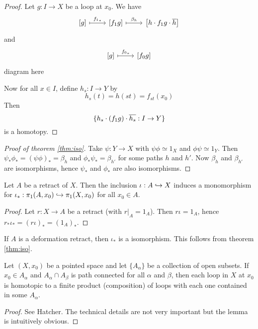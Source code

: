 \begin{proof}
	Let $g: I \to X$ be a loop at $x_0$.
	We have
	\[
	\begin{tikzcd}
		 \left[g\right] \ar[r, mapsto, "{f_1}_*"] & \left[f_1g\right] \ar[r, mapsto, "\beta_h"] & \left[h \cdot f_1g \cdot \ol{h}\right]
		\end{tikzcd}
	\]
	and
	\[
		\begin{tikzcd}
			\left[g\right] \ar[r, mapsto, "{f_0}_*"] & \left[f_0g\right]
		\end{tikzcd}
	\]
	diagram here
	
	Now for all $x \in I$, define $h_s: I \to Y$ by
	\[h_s(t)=h(st)=f_{st}(x_0)\]
	Then
	\[\{h_s \cdot (f_1g) \cdot \overline{h_s}: I \to Y\}\]
	is a homotopy.
\end{proof}

\begin{proof}[Proof of theorem \ref{thm:iso}]
	Take $\psi: Y \to X$ with $\psi\phi \simeq 1_X$ and $\phi\psi \simeq 1_Y$.
	Then $\psi_*\phi_* = (\psi\phi)_* = \beta_h$ and $\phi_*\psi_* = \beta_{h'}$ for some paths $h$ and $h'$.
	Now $\beta_h$ and $\beta_{h'}$ are isomorphisms, hence $\psi_*$ and $\phi_*$ are also isomorphisms.
\end{proof}

\begin{prop}
	Let $A$ be a retract of $X$.
	Then the inclusion $\iota: A \hookrightarrow X$ induces a monomorphism for $\iota_*: \pi_1(A,x_0) \hookrightarrow \pi_1(X,x_0)$ for all $x_0 \in A$.
\end{prop}

\begin{proof}
	Let $r: X \to A$ be a retract (with $r|_A = 1_A$).
	Then $r\iota = 1_A$, hence $r_*\iota_*=(r\iota)_*=(1_A)_*$.
\end{proof}

\begin{rmk}
	If $A$ is a deformation retract, then $\iota_*$ is a isomorphism.
	This follows from theorem \ref{thm:iso}.
\end{rmk}

\begin{lem}
	Let $(X,x_0)$ be a pointed space and let $\{A_\alpha\}$ be a collection of open subsets.
	If $x_0 \in A_\alpha$ and $A_\alpha \cap A_\beta$ is path connected for all $\alpha$ and $\beta$, then each loop in $X$ at $x_0$ is homotopic to a finite product (composition) of loops with each one contained in some $A_\alpha$.
\end{lem}

\begin{proof}
	See Hatcher.
	The technical details are not very important but the lemma is intuitively obvious.
\end{proof}
